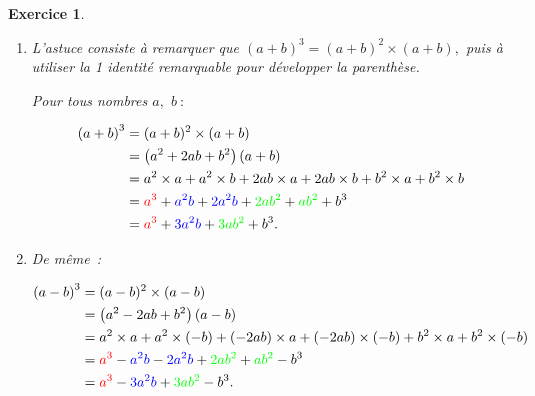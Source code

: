 \documentclass[10pt]{article}
\newtheorem{exo}{Exercice}
\begin{document}
\begin{exo}



\begin{enumerate}
\item L'astuce consiste à remarquer que $\left(a+b\right)^3=(a+b)^2\times (a+b),$ puis à utiliser la 1 identité remarquable pour développer la parenthèse.

\medskip

Pour tous nombres $a,$ $b~:$

\begin{align*}
\left(a+b\right)^3&=(a+b)^2\times (a+b)\\
&=\left(a^2+2ab+b^2\right)(a+b)\\
&=a^2\times a+a^2\times b+2ab\times a+2ab\times b+b^2\times a+b^2\times b\\
&=\textcolor{red}{a^3}+\textcolor{blue}{a^2b}+\textcolor{blue}{2a^2b}+\textcolor{green}{2ab^2}+\textcolor{green}{ab^2}+b^3\\
&=\textcolor{red}{a^3}+\textcolor{blue}{3a^2b}+\textcolor{green}{3ab^2}+b^3.\end{align*}
\item De même~:

\begin{align*}
\left(a-b\right)^3&=(a-b)^2\times (a-b)\\
&=\left(a^2-2ab+b^2\right)(a-b)\\
&=a^2\times a+a^2\times (-b)+(-2ab)\times a+(-2ab)\times (-b)+b^2\times a+b^2\times (-b)\\
&=\textcolor{red}{a^3}-\textcolor{blue}{a^2b}-\textcolor{blue}{2a^2b}+\textcolor{green}{2ab^2}+\textcolor{green}{ab^2}-b^3\\
&=\textcolor{red}{a^3}-\textcolor{blue}{3a^2b}+\textcolor{green}{3ab^2}-b^3.\end{align*}

\end{enumerate}

\end{exo}
\end{document}
